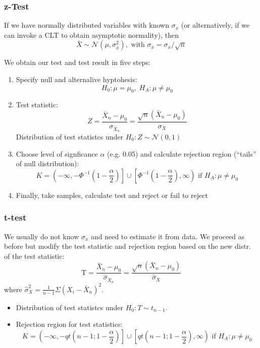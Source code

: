 \documentclass[11pt, %
	oneside, %
	english, %
	onehalfspacing, %
	]{article} %
\numberwithin{equation}{section}
\begin{document}
\subsubsection*{z-Test}

If we have normally distributed variables with known $\sigma_x$ (or alternatively, if we can invoke a CLT to obtain asymptotic normality), then
\begin{equation*}
    \bar{X}\sim \mathcal{N}(\mu, \sigma^2_{\bar{x}}), \text{ with } \sigma_{\bar{x}} =  \sigma_x / \sqrt{n}
\end{equation*}

We obtain our test and test result in five steps:
\begin{enumerate}
    \item Specify null and alternalive hyptohesis:
    \begin{equation*}
        H_0: \mu = \mu_0, \; H_A: \mu \neq \mu_0
    \end{equation*}
    \item Test statistic:
    $$
    Z=\frac{\bar{X}_n-\mu_0}{\sigma_{\bar{X}_n}}=\frac{\sqrt{n}\left(\bar{X}_n-\mu_0\right)}{\sigma_X}
    $$
    Distribution of test statistcs under $H_0: Z \sim \mathcal{N}(0,1)$
    \item Choose level of signficance $\alpha$ (e.g. 0.05) and calculate rejection region (``tails'' of null distribution):
    $$
    K=\left(-\infty,-\Phi^{-1}\left(1-\frac{\alpha}{2}\right)\right] \cup\left[\Phi^{-1}\left(1-\frac{\alpha}{2}\right), \infty\right) \text { if } H_A: \mu \neq \mu_0
    $$
    \item Finally, take samples, calculate test and reject or fail to reject
\end{enumerate}

\subsubsection*{t-test}

We usually do not know $\sigma_x$ and need to estimate it from data. We proceed as before but modify the test statistic and rejection region based on the new distr. of the test statistic:
$$
\mathrm{T}=\frac{\bar{X}_n-\mu_0}{\hat{\sigma}_{\bar{X}_n}}=\frac{\sqrt{n}\left(\bar{X}_n-\mu_0\right)}{\hat{\sigma}_X}
$$
where $\hat{\sigma}_X^2=\frac{1}{n-1} \Sigma\left(X_i-\bar{X}_n\right)^2$.

\begin{itemize}
    \item Distribution of test statistcs under $H_0: T \sim t_{n-1}$.
    \item Rejection region for test statistics:
    $$
    K=\left(-\infty,-q t\left(n-1 ; 1-\frac{\alpha}{2}\right)\right] \cup\left[q t\left(n-1 ; 1-\frac{\alpha}{2}\right), \infty\right) \text { if } H_A: \mu \neq \mu_0
    $$
\end{itemize}
\end{document}
